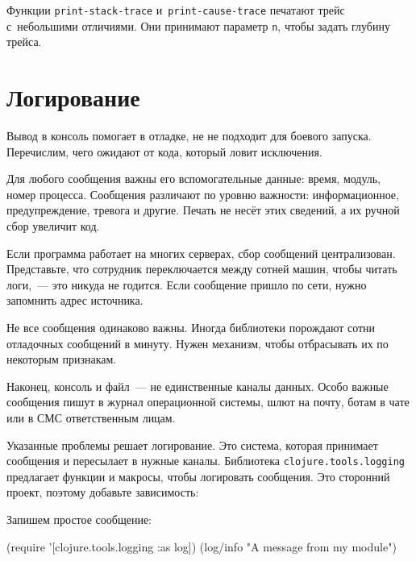 \fi

Функции \texttt{print\--stack\--trace} и~\texttt{print\--cause\--trace} печатают
трейс с~небольшими отличиями. Они принимают параметр \verb|n|, чтобы задать
глубину трейса.

\section{Логирование}


Вывод в консоль помогает в отладке, не не подходит для боевого
запуска. Перечислим, чего ожидают от кода, который ловит исключения.

Для любого сообщения важны его вспомогательные данные: время, модуль, номер
процесса. Сообщения различают по уровню важности: информационное,
предупреждение, тревога и другие. Печать не несёт этих сведений, а их ручной
сбор увеличит код.

Если программа работает на многих серверах, сбор сообщений
централизован. Представьте, что сотрудник переключается между сотней машин,
чтобы читать логи,~--- это никуда не годится. Если сообщение пришло по сети,
нужно запомнить адрес источника.

Не все сообщения одинаково важны. Иногда библиотеки порождают сотни отладочных
сообщений в минуту. Нужен механизм, чтобы отбрасывать их по некоторым признакам.

Наконец, консоль и файл~--- не единственные каналы данных. Особо важные
сообщения пишут в журнал операционной системы, шлют на почту, ботам в чате или в
СМС ответственным лицам.

Указанные проблемы решает логирование. Это система, которая принимает сообщения
и пересылает в нужные каналы. Библиотека \verb|clojure.tools.logging|
предлагает функции и макросы, чтобы логировать сообщения. Это сторонний проект,
поэтому добавьте зависимость:


\begin{english}
  \begin{clojure}
  \end{clojure}
\end{english}

\noindent
Запишем простое сообщение:

\ifx\DEVICETYPE\MOBILE

\begin{english}
  \begin{clojure}
(require
  '[clojure.tools.logging :as log])
(log/info "A message from my module")
  \end{clojure}
\end{english}

